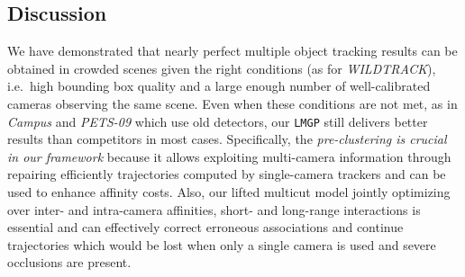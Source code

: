 \subsection{Discussion}
We have demonstrated that nearly perfect multiple object tracking results can be obtained in crowded scenes given the right conditions (as for \textit{WILDTRACK}), i.e.\ high bounding box quality and a large enough number of well-calibrated cameras observing the same scene.
Even when these conditions are not met, as in \textit{Campus} and \textit{PETS-09} which use old detectors, our \texttt{LMGP} still delivers better results than competitors in most cases.
Specifically, the \textit{pre-clustering is crucial in our framework} because it allows exploiting multi-camera information through repairing efficiently trajectories computed by single-camera trackers and can be used to enhance affinity costs.
Also, our lifted multicut model jointly optimizing over inter- and intra-camera affinities, short- and long-range interactions is essential and can effectively correct erroneous associations and continue trajectories which would be lost when only a single camera is used and severe occlusions are present.





































































%
